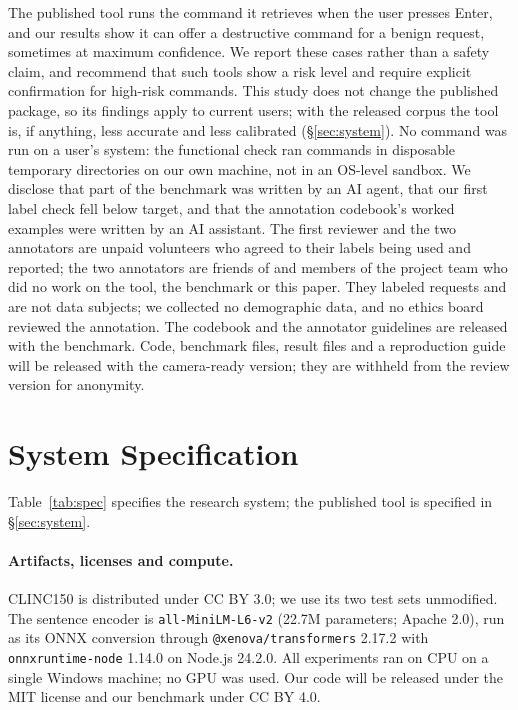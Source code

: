 The published tool runs the command it retrieves when the user presses Enter, and our results show it can offer a
destructive command for a benign request, sometimes at maximum confidence. We report these cases rather than a safety
claim, and recommend that such tools show a risk level and require explicit confirmation for high-risk commands. This
study does not change the published package, so its findings apply to current users; with the released corpus the
tool is, if anything, less accurate and less calibrated (\S\ref{sec:system}). No command was run on a user's system:
the functional check ran commands in disposable temporary directories on our own machine, not in an OS-level
sandbox. We disclose that part of the benchmark was
written by an AI agent, that our first label check fell below target, and that the annotation codebook's worked
examples were written by an AI assistant. The first reviewer and the two annotators are unpaid volunteers who agreed
to their labels being used and reported; the two annotators are friends of \authorrel{} and members of the project
team who did no work on the tool, the benchmark or this paper. They labeled requests and are not data subjects; we
collected no demographic data, and no ethics board reviewed the annotation. The codebook and the annotator
guidelines are released with the benchmark. Code, benchmark files, result files and a
reproduction guide will be released with the camera-ready version; they are withheld from the review version for
anonymity.

\aiacknowledgements



\appendix

\section{System Specification}
\label{app:spec}

Table~\ref{tab:spec} specifies the research system; the published tool is specified in \S\ref{sec:system}.

\paragraph{Artifacts, licenses and compute.} CLINC150 is distributed under CC BY 3.0; we use its two test sets
unmodified. The sentence encoder is \texttt{all-MiniLM-L6-v2} (22.7M parameters; Apache 2.0), run as its ONNX
conversion through \texttt{@xenova/transformers} 2.17.2 with \texttt{onnxruntime-node} 1.14.0 on Node.js 24.2.0.
All experiments ran on CPU on a single Windows machine; no GPU was used. Our code will be released under the MIT
license and our benchmark under CC BY 4.0.

